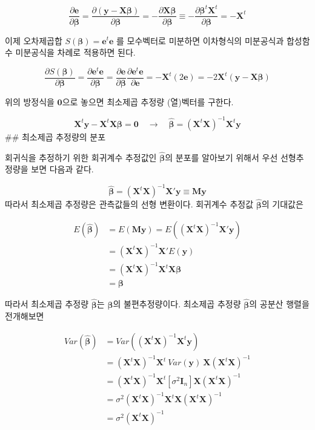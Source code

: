 \documentclass[
  11pt,
  a4paper,
  oneside]{scrbook}
\newcommand{\pardifftwo}[2]{\frac{\partial #1}{\partial #2 }}
\theoremstyle{definition}
\theoremstyle{plain}
\theoremstyle{definition}
\theoremstyle{definition}
\theoremstyle{remark}
\begin{document}
\[ 
\pardifftwo{\pmb e}{\pmb \beta} = \pardifftwo{ (\pmb y - \pmb X \pmb \beta)}{ \pmb \beta} =
- \pardifftwo{ \pmb X \pmb \beta}{ \pmb \beta} \equiv
- \pardifftwo{\pmb \beta^t \pmb X^t }{\pmb \beta} = -\pmb X^t 
\]

이제 오차제곱합 \(S( {\pmb \beta})=\pmb e^t \pmb e\) 를 모수벡터로
미분하면 이차형식의 미분공식과 합성함수 미분공식을 차례로 적용하면 된다.

\[  
\pardifftwo{ S( {\pmb \beta})}{\pmb \beta}=\pardifftwo{\pmb e^t \pmb e}{\pmb \beta} =  \pardifftwo{\pmb e }{\pmb \beta} \pardifftwo{\pmb e^t  \pmb e}{\pmb e} = -\pmb X^t \left( 2 \pmb e \right ) = -2 \pmb X^t (\pmb y - \pmb X \pmb \beta)  
\]

위의 방정식을 \(\pmb 0\)으로 놓으면 최소제곱 추정량 (열)벡터를 구한다.

\[ 
\pmb X^t \pmb y - \pmb X^t  \pmb X \pmb \beta = \pmb 0 \quad \rightarrow \quad
\hat{\pmb \beta}  = (\pmb X^t  \pmb X)^{-1} \pmb X^t  \pmb y 
\] \#\# 최소제곱 추정량의 분포

회귀식을 추정하기 위한 회귀계수 추정값인 \(\hat {\pmb \beta}\)의 분포를
알아보기 위해서 우선 선형추정량을 보면 다음과 같다.

\[ \hat {\pmb \beta}  = (\pmb X^t\pmb X)^{-1}\pmb X' \pmb y \equiv  \pmb M \pmb y \]
따라서 최소제곱 추정량은 관측값들의 선형 변환이다. 회귀계수 추정값
\(\hat {\pmb \beta}\)의 기대값은

\[
\begin{align}
 E( \hat {\pmb \beta}  ) &= E( \pmb M \pmb y) = E(( \pmb X^t \pmb X)^{-1} \pmb X' \pmb y) \\
 &= ( \pmb X^t \pmb X)^{-1} \pmb X'E( \pmb y) \\
 &= ( \pmb X^t \pmb X)^{-1} \pmb X^t \pmb X \pmb \beta \\
  &= \pmb \beta
\end{align}
\]

따라서 최소제곱 추정량 \(\hat {\pmb \beta}\)는 \(\pmb \beta\)의
불편추정량이다. 최소제곱 추정량 \(\hat {\pmb \beta}\)의 공분산 행렬을
전개해보면

\[
\begin{align}
 Var( \hat {\pmb \beta} ) &= Var(( \pmb X^t \pmb X)^{-1} \pmb X^t \pmb y) \\
&= ( \pmb X^t \pmb X)^{-1} \pmb X^t ~ Var( \pmb y) ~ \pmb X ( \pmb X^t \pmb X)^{-1} \\
&=( \pmb X^t \pmb X)^{-1} \pmb X^t[\sigma^2  \pmb I_n] \pmb X( \pmb X^t \pmb X)^{-1} \\
&= \sigma^2( \pmb X^t \pmb X)^{-1} \pmb X^t \pmb X( \pmb X^t \pmb X)^{-1} \\
&= \sigma^2( \pmb X^t \pmb X)^{-1} \\
\end{align}
\]
\end{document}
